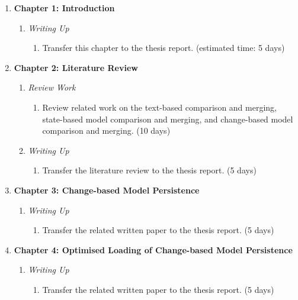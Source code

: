 \documentclass[12pt, a4paper]{report} \usepackage[titletoc]{appendix}
\begin{document}
\begin{enumerate}
    \setlength\itemsep{0pt}
    \item \textbf{Chapter 1: Introduction}
    \begin{enumerate}
        \item \textit{Writing Up}
        \begin{enumerate}
            \item Transfer this chapter to the thesis report. (estimated time: 5 days)
        \end{enumerate}
    \end{enumerate}
    \item \textbf{Chapter 2: Literature Review}
    \begin{enumerate}
        \item \textit{Review Work}
        \begin{enumerate}
            \item Review related work on the text-based comparison and merging, state-based model comparison and merging, and change-based model  comparison and merging. (10 days)
        \end{enumerate}
        \item \textit{Writing Up}
        \begin{enumerate}
            \item Transfer the literature review to the thesis report. (5 days)
        \end{enumerate}
    \end{enumerate}
    \item \textbf{Chapter 3: Change-based Model Persistence}
    \begin{enumerate}
        \item \textit{Writing Up}
        \begin{enumerate}
            \item Transfer the related written paper to the thesis report. (5 days)
        \end{enumerate}
    \end{enumerate}
    \item \textbf{Chapter 4: Optimised Loading of Change-based Model Persistence}
    \begin{enumerate}
        \item \textit{Writing Up}
        \begin{enumerate}
            \item Transfer the related written paper to the thesis report. (5 days)
        \end{enumerate}

\end{enumerate}
\end{enumerate}
\end{document}

